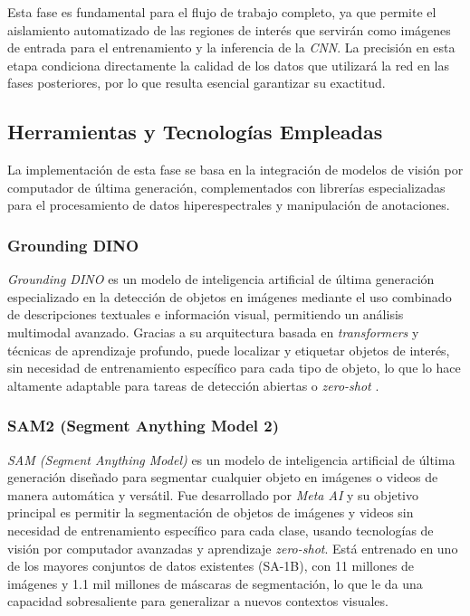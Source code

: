 \vspace{5mm}

Esta fase es fundamental para el flujo de trabajo completo, ya que permite el aislamiento automatizado de las regiones de interés que servirán como imágenes de entrada para el entrenamiento y la inferencia de la \emph{CNN}. La precisión en esta etapa condiciona directamente la calidad de los datos que utilizará la red en las fases posteriores, por lo que resulta esencial garantizar su exactitud.

\subsection{Herramientas y Tecnologías Empleadas}

La implementación de esta fase se basa en la integración de modelos de visión por computador de última generación, complementados con librerías especializadas para el procesamiento de datos hiperespectrales y manipulación de anotaciones.

\subsubsection{Grounding DINO}

\emph{Grounding DINO} \cite{liu2023grounding,ren2024grounding} es un modelo de inteligencia artificial de última generación especializado en la detección de objetos en imágenes mediante el uso combinado de descripciones textuales e información visual, permitiendo un análisis multimodal avanzado. Gracias a su arquitectura basada en \emph{transformers} \cite{vaswani2023attentionneed} y técnicas de aprendizaje profundo, puede localizar y etiquetar objetos de interés, sin necesidad de entrenamiento específico para cada tipo de objeto, lo que lo hace altamente adaptable para tareas de detección abiertas o \emph{zero-shot} \cite{socher2013zeroshotlearningcrossmodaltransfer}.

\subsubsection{SAM2 (Segment Anything Model 2)}

\emph{SAM (Segment Anything Model)} \cite{kirillov2023segany, ravi2024sam2segmentimages} es un modelo de inteligencia artificial de última generación diseñado para segmentar cualquier objeto en imágenes o videos de manera automática y versátil. Fue desarrollado por \emph{Meta AI} y su objetivo principal es permitir la segmentación de objetos de imágenes y videos sin necesidad de entrenamiento específico para cada clase, usando tecnologías de visión por computador avanzadas y aprendizaje \emph{zero-shot}. Está entrenado en uno de los mayores conjuntos de datos existentes (SA-1B), con 11 millones de imágenes y 1.1 mil millones de máscaras de segmentación, lo que le da una capacidad sobresaliente para generalizar a nuevos contextos visuales.

